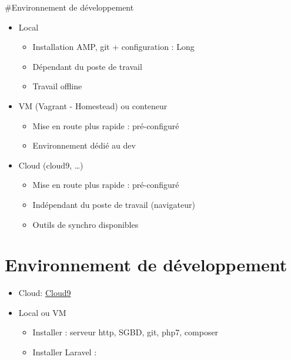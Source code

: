 \#Environnement de développement

\begin{itemize}
\tightlist
\item
  Local

  \begin{itemize}
  \tightlist
  \item
    Installation AMP, git + configuration : Long
  \item
    Dépendant du poste de travail
  \item
    Travail offline
  \end{itemize}
\item
  VM (Vagrant - Homestead) ou conteneur

  \begin{itemize}
  \tightlist
  \item
    Mise en route plus rapide : pré-configuré
  \item
    Environnement dédié au dev
  \end{itemize}
\item
  Cloud (cloud9, \ldots{})

  \begin{itemize}
  \tightlist
  \item
    Mise en route plus rapide : pré-configuré
  \item
    Indépendant du poste de travail (navigateur)
  \item
    Outils de synchro disponibles
  \end{itemize}
\end{itemize}

\hypertarget{environnement-de-duxe9veloppement}{%
\section{Environnement de
développement}\label{environnement-de-duxe9veloppement}}

\begin{itemize}
\tightlist
\item
  Cloud:
  \href{https://community.c9.io/t/laravel-5-3-installation-on-cloud9/9038}{Cloud9}
\item
  Local ou VM

  \begin{itemize}
  \tightlist
  \item
    Installer : serveur http, SGBD, git, php7, composer
  \item
    Installer Laravel :
  \end{itemize}
\end{itemize}

